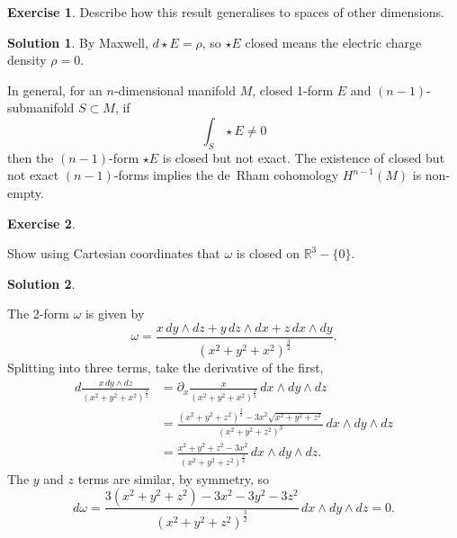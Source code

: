 \documentclass[11pt, a4paper]{report}
\theoremstyle{definition}
\newtheorem{ex}{Exercise}[part]
\newtheorem{sol}{Solution}[part]
\begin{document}
\begin{ex}

Describe how this result generalises to spaces of other dimensions.

\end{ex}

\begin{sol}

By Maxwell, $d \star E = \rho$, so $\star E$ closed means the electric charge density $\rho = 0$.

In general, for an $n$-dimensional manifold $M$, closed 1-form $E$ and $(n - 1)$-submanifold $S \subset M$, if
\[
    \int_S \star E \neq 0
\]
then the $(n-1)$-form $\star E$ is closed but not exact.
The existence of closed but not exact $(n - 1)$-forms implies the de~Rham cohomology $H^{n - 1}(M)$ is non-empty.

\end{sol}

\begin{ex}\label{ex:closedbutnotexact2form}

Show using Cartesian coordinates that $\omega$ is closed on $\mathbb{R}^3 - \{0\}$.

\end{ex}

\begin{sol}\label{sol:closedbutnotexact2form}

The 2-form $\omega$ is given by
\[
    \omega = \frac{x \, dy \wedge dz + y \, dz \wedge dx + z \, dx \wedge dy}{{(x^2 + y^2 + x^2)}^\frac{3}{2}}.
\]
Splitting into three terms, take the derivative of the first,
\begin{align*}
    d \frac{x \, dy \wedge dz}{{(x^2 + y^2 + x^2)}^\frac{3}{2}}
        &= \partial_x \frac{x}{{(x^2 + y^2 + x^2)}^\frac{3}{2}} \, dx \wedge dy \wedge dz \\
        &= \frac{{(x^2 + y^2 + z^2)}^\frac{3}{2} - 3x^2 \sqrt{x^2 + y^2 + z^2}}{{(x^2 + y^2 + z^2)}^3} \, dx \wedge dy \wedge dz \\
        &= \frac{x^2 + y^2 + z^2 - 3x^2}{{(x^2 + y^2 + z^2)}^\frac{3}{2}} \, dx \wedge dy \wedge dz.
\end{align*}
The $y$ and $z$ terms are similar, by symmetry,
so
\[
    d\omega = \frac{3(x^2 + y^2 + z^2) - 3x^2 - 3y^2 - 3z^2}{{(x^2 + y^2 + z^2)}^\frac{3}{2}} \, dx \wedge dy \wedge dz = 0.
\]

\end{sol}
\end{document}
